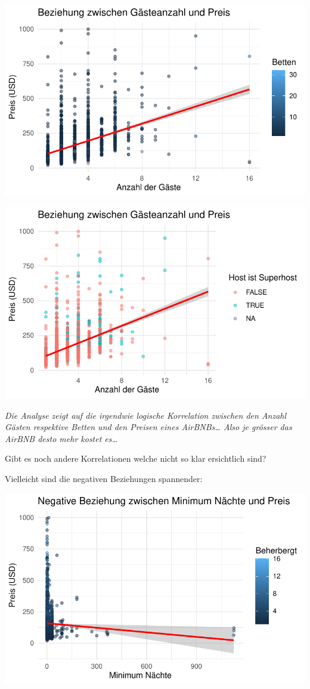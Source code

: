 \documentclass[
  journal,
]{IEEEtran}%
\begin{document}
\includegraphics{main_files/figure-pdf/unnamed-chunk-7-2.pdf}

\includegraphics{main_files/figure-pdf/unnamed-chunk-7-3.pdf}

\emph{Die Analyse zeigt auf die irgendwie logische Korrelation zwischen
den Anzahl Gästen respektive Betten und den Preisen eines
AirBNBs\ldots{} Also je grösser das AirBNB desto mehr kostet es\ldots{}}

Gibt es noch andere Korrelationen welche nicht so klar ersichtlich sind?

Vielleicht sind die negativen Beziehungen spannender:

\includegraphics{main_files/figure-pdf/unnamed-chunk-8-1.pdf}
\end{document}

